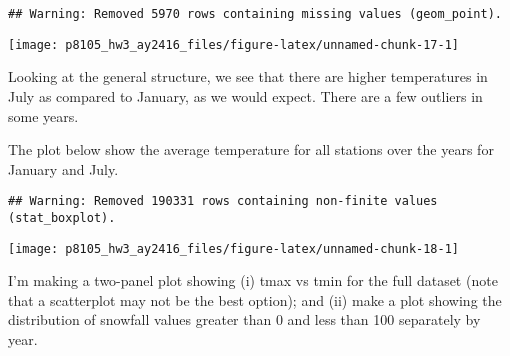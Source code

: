 \documentclass[]{article}
\newenvironment{Shaded}{\begin{snugshade}}{\end{snugshade}}
\newcommand{\KeywordTok}[1]{\textcolor[rgb]{0.13,0.29,0.53}{\textbf{#1}}}
\newcommand{\DataTypeTok}[1]{\textcolor[rgb]{0.13,0.29,0.53}{#1}}
\newcommand{\DecValTok}[1]{\textcolor[rgb]{0.00,0.00,0.81}{#1}}
\newcommand{\StringTok}[1]{\textcolor[rgb]{0.31,0.60,0.02}{#1}}
\newcommand{\OperatorTok}[1]{\textcolor[rgb]{0.81,0.36,0.00}{\textbf{#1}}}
\newcommand{\NormalTok}[1]{#1}
\begin{document}
\begin{verbatim}
## Warning: Removed 5970 rows containing missing values (geom_point).
\end{verbatim}

\texttt{[image: p8105\_hw3\_ay2416\_files/figure-latex/unnamed-chunk-17-1]}

Looking at the general structure, we see that there are higher
temperatures in July as compared to January, as we would expect. There
are a few outliers in some years.

The plot below show the average temperature for all stations over the
years for January and July.

\begin{Shaded}
\end{Shaded}

\begin{verbatim}
## Warning: Removed 190331 rows containing non-finite values (stat_boxplot).
\end{verbatim}

\texttt{[image: p8105\_hw3\_ay2416\_files/figure-latex/unnamed-chunk-18-1]}

I'm making a two-panel plot showing (i) tmax vs tmin for the full
dataset (note that a scatterplot may not be the best option); and (ii)
make a plot showing the distribution of snowfall values greater than 0
and less than 100 separately by year.
\end{document}
